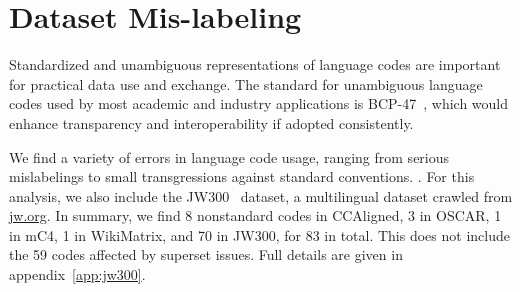 \section{Dataset Mis-labeling}
\label{sec:codes}


Standardized and unambiguous representations of language codes are important for practical data use and exchange. The standard for unambiguous language codes used by most academic and industry applications is BCP-47~\citep{phillips2006tags}, which would  enhance transparency and interoperability if adopted consistently. %

We find a variety of errors in language code usage, ranging from serious mislabelings to small transgressions against standard conventions. . For this analysis, we also include the JW300~\citep{agic-vulic-2019-jw300} dataset, a multilingual dataset crawled from \url{jw.org}. %
In summary, we find 8 nonstandard codes in CCAligned, 3 in OSCAR, 1 in mC4, 1 in WikiMatrix, and 70 in JW300, for 83 in total. This does not include the 59 codes affected by superset issues. %
Full details are given in appendix~\ref{app:jw300}.


